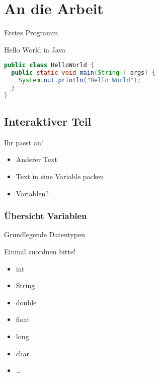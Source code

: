 \documentclass{beamer}
\begin{document}
\section{An die Arbeit}
\begin{frame}[fragile]{Erstes Programm}
\begin{exampleblock}{Hello World in Java}
\begin{lstlisting}[language=java]
public class HelloWorld {
  public static void main(String[] args) {
    System.out.println("Hello World");
  }
}
\end{lstlisting}
\end{exampleblock}
\end{frame}

\subsection{Interaktiver Teil}
\begin{frame}{Ihr passt an!}
\begin{exampleblock}{}
\begin{itemize}
\item Anderer Text
\pause
\item Text in eine Variable packen
\pause
\item Variablen? 
\end{itemize}
\end{exampleblock}
\end{frame}

\subsubsection{Übersicht Variablen}
\begin{frame}{Grundlegende Datentypen}
\begin{exampleblock}{Einmal zuordnen bitte!}
\begin{itemize}
\item int
\item String
\item double
\item float
\item long
\item char
\item \dots
\end{itemize}
\end{exampleblock}
\end{frame}
\end{document}
